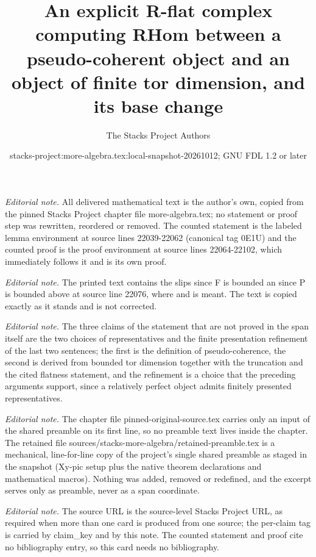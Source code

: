 \documentclass[10pt,a4paper]{amsart}
\title{An explicit R-flat complex computing RHom between a pseudo-coherent object and an object of finite tor dimension, and its base change}
\author{The Stacks Project Authors}
\date{stacks-project:more-algebra.tex:local-snapshot-20261012; GNU FDL 1.2 or later}
\theoremstyle{plain}
\theoremstyle{definition}
\theoremstyle{remark}
\numberwithin{equation}{subsection}
\begin{document}
\maketitle
\setcounter{subsection}{1}
\noindent\textit{Editorial note.} All delivered mathematical text is the author's own, copied from the pinned Stacks Project chapter file more-algebra.tex; no statement or proof step was rewritten, reordered or removed. The counted statement is the labeled lemma environment at source lines 22039-22062 (canonical tag 0E1U) and the counted proof is the proof environment at source lines 22064-22102, which immediately follows it and is its own proof.\par\medskip
\noindent\textit{Editorial note.} The printed text contains the slips since F is bounded an since P is bounded above at source line 22076, where and is meant. The text is copied exactly as it stands and is not corrected.\par\medskip
\noindent\textit{Editorial note.} The three claims of the statement that are not proved in the span itself are the two choices of representatives and the finite presentation refinement of the last two sentences; the first is the definition of pseudo-coherence, the second is derived from bounded tor dimension together with the truncation and the cited flatness statement, and the refinement is a choice that the preceding arguments support, since a relatively perfect object admits finitely presented representatives.\par\medskip
\noindent\textit{Editorial note.} The chapter file pinned-original-source.tex carries only an input of the shared preamble on its first line, so no preamble text lives inside the chapter. The retained file sources/stacks-more-algebra/retained-preamble.tex is a mechanical, line-for-line copy of the project's single shared preamble as staged in the snapshot (Xy-pic setup plus the native theorem declarations and mathematical macros). Nothing was added, removed or redefined, and the excerpt serves only as preamble, never as a span coordinate.\par\medskip
\noindent\textit{Editorial note.} The source URL is the source-level Stacks Project URL, as required when more than one card is produced from one source; the per-claim tag is carried by claim\_key and by this note. The counted statement and proof cite no bibliography entry, so this card needs no bibliography.\par\medskip
\end{document}
